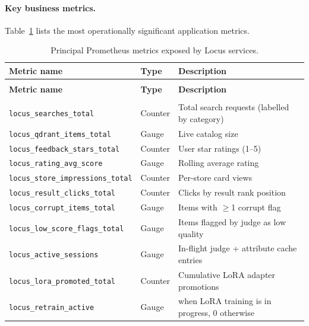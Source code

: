 \documentclass[12pt]{article}
\begin{document}
\paragraph{Key business metrics.} Table~\ref{tab:metrics} lists the most operationally significant application metrics.

\begin{longtable}{@{} >{\RaggedRight\arraybackslash}p{7.5cm} >{\RaggedRight\arraybackslash}p{1.5cm} >{\RaggedRight\arraybackslash}p{6.0cm} @{}}
\caption{Principal Prometheus metrics exposed by Locus services.}
\label{tab:metrics}\\
\toprule
\textbf{Metric name} & \textbf{Type} & \textbf{Description} \\
\midrule
\endfirsthead
\multicolumn{3}{c}{\tablename~\thetable{} (continued)}\\
\toprule
\textbf{Metric name} & \textbf{Type} & \textbf{Description} \\
\midrule
\endhead
\midrule
\multicolumn{3}{r}{\itshape Continued on next page\ldots}\\
\endfoot
\bottomrule
\endlastfoot
\texttt{locus\_searches\_total}            & Counter   & Total search requests (labelled by category) \\
\texttt{locus\_qdrant\_items\_total}       & Gauge     & Live catalog size \\
\texttt{locus\_feedback\_stars\_total}     & Counter   & User star ratings (1--5) \\
\texttt{locus\_rating\_avg\_score}         & Gauge     & Rolling average rating \\
\texttt{locus\_store\_impressions\_total}  & Counter   & Per-store card views \\
\texttt{locus\_result\_clicks\_total}      & Counter   & Clicks by result rank position \\
\texttt{locus\_corrupt\_items\_total}      & Gauge     & Items with $\ge$1 corrupt flag \\
\texttt{locus\_low\_score\_flags\_total}   & Gauge     & Items flagged by judge as low quality \\
\texttt{locus\_active\_sessions}           & Gauge     & In-flight judge + attribute cache entries \\
\texttt{locus\_lora\_promoted\_total}          & Counter   & Cumulative LoRA adapter promotions \\
\texttt{locus\_retrain\_active}                & Gauge     & 1 when LoRA training is in progress, 0 otherwise \\

\end{longtable}
\end{document}
